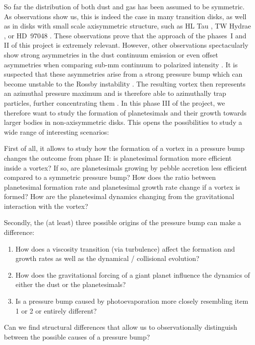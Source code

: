 \documentclass[10pt,fleqn,twoside]{article}
\begin{document}
So far the distribution of both dust and gas has been assumed to be
symmetric. As observations show us, this is indeed the case in many
transition disks, as well as in disks with small scale axisymmetric
structure, such as HL Tau
\citep{2015ApJ...808L...3A,2016ApJ...821L..16C}, TW Hydrae
\citep{2016ApJ...820L..40A,2016ApJ...829L..35T}, or HD~97048
\citep{2016arXiv160902488V}. These observations prove that the
approach of the phases~I and II of this project is extremely relevant.
However, other observations spectacularly show strong asymmetries in
the dust continuum emission \citep[e.g.,][]{2013Natur.493..191C,
2013Sci...340.1199V} or even offset asymmetries when comparing sub-mm
continuum to polarized intensity \cite[see][]{2016ApJ...831L..12K}.
It is suspected that these asymmetries arise from a strong pressure
bump which can become unstable to the Rossby instability
\citep[e.g.,][]{2001ApJ...551..874L,2009A&A...493.1125L}.
The resulting vortex then represents an azimuthal pressure maximum and
is therefore able to azimuthally trap particles, further concentrating
them \citep[e.g.,][]{1995A&A...295L...1B, 1997Icar..128..213K,
2009A&A...493.1125L, 2013A&A...550L...8B, 2013ApJ...775...17L}. In
this phase III of the project, we therefore want to study the
formation of planetesimals and their growth towards larger bodies in
non-axisymmetric disks. This opens the possibilities to study a wide
range of interesting scenarios:

First of all, it allows to study how the formation of a vortex in a
pressure bump changes the outcome from phase II: is planetesimal
formation more efficient inside a vortex? If so, are planetesimals
growing by pebble accretion less efficient compared to a symmetric
pressure bump? How does the ratio between planetesimal formation rate
and planetesimal growth rate change if a vortex is formed? How are the
planetesimal dynamics changing from the gravitational interaction with
the vortex?

Secondly, the (at least) three possible origins of the pressure bump
can make a difference:
\begin{enumerate}
  \item How does a viscosity transition (via turbulence) affect the
  formation and growth rates as well as the dynamical / collisional
  evolution?
  \item How does the gravitational forcing of a giant planet influence
  the dynamics of either the dust or the planetesimals?
  \item Is a pressure bump caused by photoevaporation more closely
  resembling item 1 or 2 or entirely different?
\end{enumerate}
Can we find structural differences that allow us to observationally
distinguish between the possible causes of a pressure bump?
\end{document}
